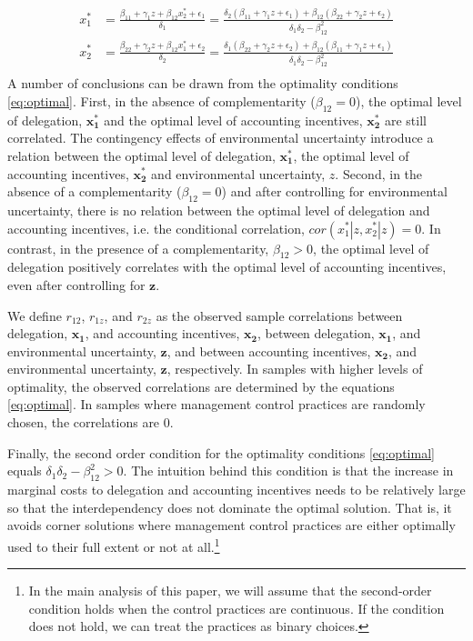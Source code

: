 \documentclass[12pt]{article}
\begin{document}
\begin{equation}\label{eq:optimal}
\begin{aligned}
x_1^* &= \frac{\beta_{11} + \gamma_1 z + \beta_{12} x_2^*  + \epsilon_{1}}{\delta_1 }
		      = \frac{\delta_2 (\beta_{11} + \gamma_1 z + \epsilon_1) 
           					+ \beta_{12} (\beta_{22} + \gamma_2 z + \epsilon_2) }
                            {\delta_1 \delta_2 - \beta_{12}^2} \\
 x_2^* &= \frac{\beta_{22} + \gamma_2 z + \beta_{12} x_1^* + \epsilon_{2}}{\delta_2  }
		      =  \frac{\delta_1 (\beta_{22} + \gamma_2 z + \epsilon_2) 
           					+ \beta_{12} (\beta_{11} + \gamma_1 z + \epsilon_1) }
                            {\delta_1 \delta_2 - \beta_{12}^2} \\
\end{aligned}
\end{equation}
A number of conclusions can be drawn from the optimality conditions \eqref{eq:optimal}. First, in the absence of complementarity ($\beta_{12}=0$), the optimal level of delegation, $\mathbf{x^*_1}$ and the optimal level of accounting incentives, $\mathbf{x^*_2}$ are still correlated. The contingency effects of environmental uncertainty introduce a relation between the optimal level of delegation, $\mathbf{x^*_1}$, the optimal level of accounting incentives, $\mathbf{x^*_2}$ and environmental uncertainty, $z$. Second, in the absence of a complementarity ($\beta_{12} = 0$) and after controlling for environmental uncertainty, there is no relation between the optimal level of delegation and accounting incentives, i.e. the conditional correlation, $cor(x^*_1 | z, x^*_2 |z) = 0$.  In contrast, in the presence of a complementarity, $\beta_{12} > 0$, the optimal level of delegation positively correlates with the optimal level of accounting incentives, even after controlling for $\mathbf{z}$. 

We define $r_{12}$, $r_{1z}$, and $r_{2z}$ as the observed sample correlations between delegation, $\mathbf{x_1}$, and accounting incentives, $\mathbf{x_2}$,  between delegation, $\mathbf{x_1}$, and environmental uncertainty, $\mathbf{z}$, and between accounting incentives, $\mathbf{x_2}$, and environmental uncertainty, $\mathbf{z}$, respectively. In samples with higher levels of optimality, the observed correlations are determined by the equations \eqref{eq:optimal}.  In samples where management control practices are randomly chosen, the correlations are $0$. 

Finally, the second order condition for the optimality conditions \eqref{eq:optimal} equals $\delta_1 \delta_2 - \beta_{12}^2 > 0$. The intuition behind this condition is that the increase in marginal costs to delegation and accounting incentives needs to be relatively large so that the interdependency does not dominate the optimal solution. That is, it avoids corner solutions where management control practices are either optimally used to their full extent or not at all.\footnote{In the main analysis of this paper, we will assume that the second-order condition holds when the control practices are continuous. If the condition does not hold, we can treat the practices as binary choices.}
\end{document}
